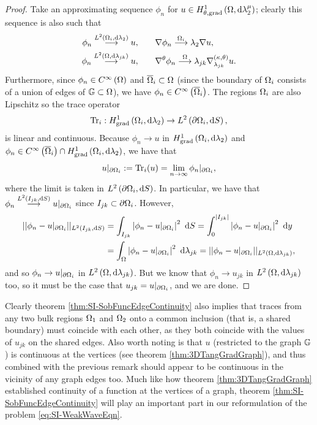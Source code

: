 \begin{proof}
	Take an approximating sequence $\phi_n$ for $u\in H^1_{\theta, \mathrm{grad}}\left( \Omega, \mathrm{d}\lambda_2^{\mu} \right)$; clearly this sequence is also such that
	\begin{align*}
		\phi_n \overset{L^{2}\left( \Omega_i,\mathrm{d} \lambda_2 \right)}{\longrightarrow} u, &\qquad \nabla\phi_n\overset{\Omega_i}{\longrightarrow}{\lambda_2}\nabla u, \\
		\phi_n \overset{L^{2}\left( \Omega,\mathrm{d} \lambda_{jk} \right)}{\longrightarrow} u, &\qquad \nabla^{\theta}\phi_n\overset{\Omega}{\longrightarrow}{\lambda_{jk}}\nabla^{\left( \kappa, \theta \right)}_{\lambda_{jk}} u.
	\end{align*}
	Furthermore, since $\phi_n\in C^{\infty}\left( \Omega \right)$ and $\overline{\Omega}_i\subset\Omega$ (since the boundary of $\Omega_i$ consists of a union of edges of $\mathbb{G}\subset\Omega$), we have $\phi_n\in C^{\infty}\left( \overline{\Omega}_i \right)$.
	The regions $\Omega_i$ are also Lipschitz so the trace operator
	\begin{align*}
		\mathrm{Tr}_i: H^1_\mathrm{grad}\left( \Omega_i, \mathrm{d}\lambda_2 \right) \rightarrow L^{2}\left( \partial\Omega_i,\mathrm{d} S \right),
	\end{align*}
	is linear and continuous.
	Because $\phi_n\rightarrow u$ in $H^1_\mathrm{grad}\left( \Omega_i, \mathrm{d}\lambda_2 \right)$ and $\phi_n\in C^{\infty}\left( \overline{\Omega}_i \right)\cap H^1_\mathrm{grad}\left( \Omega_i, \mathrm{d}\lambda_2 \right)$, we have that
	\begin{align*}
		u\vert_{\partial\Omega_i} := \mathrm{Tr}_i(u) = \lim_{n\rightarrow\infty}\phi_n\vert_{\partial\Omega_i},
	\end{align*}
	where the limit is taken in $L^{2}\left( \partial\Omega_i,\mathrm{d} S \right)$.
	In particular, we have that $\phi_n\overset{L^{2}\left( I_{jk},\mathrm{d} S \right)}{\longrightarrow}u\vert_{\partial\Omega_i}$ since $I_{jk}\subset\partial\Omega_i$.
	However,
	\begin{align*}
		\lvert\lvert  \phi_n - u\vert_{\partial\Omega_i}  \rvert\rvert_{L^{2}\left( I_{jk},\mathrm{d} S \right)}
		&= \int_{I_{jk}}\left\lvert  \phi_n - u\vert_{\partial\Omega_i}  \right\rvert^2 \ \mathrm{d}S
		= \int_0^{\left\lvert I_{jk} \right\rvert} \left\lvert  \phi_n - u\vert_{\partial\Omega_i}  \right\rvert^2 \ \mathrm{d} y \\
		&= \int_{\Omega}\left\lvert  \phi_n - u\vert_{\partial\Omega_i}  \right\rvert^2 \ \mathrm{d}\lambda_{jk}
		= \lvert\lvert  \phi_n - u\vert_{\partial\Omega_i}  \rvert\rvert_{L^{2}\left( \Omega,\mathrm{d} \lambda_{jk} \right)},
	\end{align*}
	and so $\phi_n\rightarrow u\vert_{\partial\Omega_i}$ in $L^{2}\left( \Omega,\mathrm{d} \lambda_{jk} \right)$.
	But we know that $\phi_n\rightarrow u_{jk}$ in $L^{2}\left( \Omega,\mathrm{d} \lambda_{jk} \right)$ too, so it must be the case that $u_{jk} = u\vert_{\partial\Omega_i}$, and we are done.
\end{proof}
Clearly theorem \ref{thm:SI-SobFuncEdgeContinuity} also implies that traces from any two bulk regions $\Omega_1$ and $\Omega_2$ onto a common inclusion (that is, a shared boundary) must coincide with each other, as they both coincide with the values of $u_{jk}$ on the shared edges.
Also worth noting is that $u$ (restricted to the graph $\mathbb{G}$) is continuous at the vertices (see theorem \ref{thm:3DTangGradGraph}), and thus combined with the previous remark should appear to be continuous in the vicinity of any graph edges too.
Much like how theorem \ref{thm:3DTangGradGraph} established continuity of a function at the vertices of a graph, theorem \ref{thm:SI-SobFuncEdgeContinuity} will play an important part in our reformulation of the problem \eqref{eq:SI-WeakWaveEqn}.